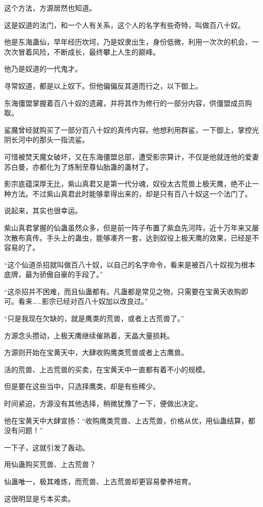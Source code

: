 \begin{this_body}
这个方法，方源居然也知道。

这是奴道的法门，和一个人有关系，这个人的名字有些奇特，叫做百八十奴。

他是东海蛊仙，早年经历坎坷，乃是奴隶出生，身份低微，利用一次次的机会，一次次冒着风险，不断成长，最终攀上人生的巅峰。

他乃是奴道的一代鬼才。

寻常奴道，都是以上奴下。但他偏偏反其道而行之，以下御上。

东海僵盟掌握着百八十奴的遗藏，并将其作为修行的一部分内容，供僵盟成员购取。

鲨魔曾经就购买了一部分百八十奴的真传内容。他想利用群鲨，一下御上，掌控光阴长河中的那头一指流鲨。

可惜被焚天魔女破坏，又在东海僵盟总部，遭受影宗算计，不仅是他就连他的爱妻苏白曼，亦都化为了炼制至尊仙胎蛊的蛊材了。

影宗底蕴深厚无比，紫山真君又是第一代分魂，奴役太古荒兽上极天鹰，绝不止一种方法。不过紫山真君此时能够拿得出来的，却是只有百八十奴这一个法门了。

说起来，其实也很幸运。

紫山真君掌握的仙蛊虽然众多，但是前一阵子布置了紫血先河阵，近十万年来又屡次散布真传。手头上的蛊虫，能够凑齐一套，达到奴役上极天鹰的效果，已经是不容易的了。

“这个仙道杀招就叫做百八十奴，以自己的名字命令，看来是被百八十奴视为根本底牌，最为骄傲自豪的手段了。”

“这杀招并不困难，而且仙蛊都有。凡蛊都是常见之物，只需要在宝黄天收购即可。看来……影宗已经对百八十奴加以改良过。”

“只是我现在欠缺的，就是鹰类的荒兽，或者上古荒兽了。”

方源念头攒动，上极天鹰继续催熟着，天晶大量损耗。

方源则开始在宝黄天中，大肆收购鹰类荒兽或者上古鹰兽。

活的荒兽、上古荒兽的买卖，在宝黄天中一直都有着不小的规模。

但是要在这些当中，只选择鹰类，却是有些稀少。

时间紧迫，方源没有其他选择，稍微犹豫了一下，便做出决定。

他在宝黄天中大肆宣扬：“收购鹰类荒兽、上古荒兽，价格从优，用仙蛊结算，都没有问题！”

一下子，这就引发了轰动。

用仙蛊购买荒兽、上古荒兽？

仙蛊唯一，极其难炼，而荒兽、上古荒兽却更容易豢养培育。

这很明显是亏本买卖。


\end{this_body}
